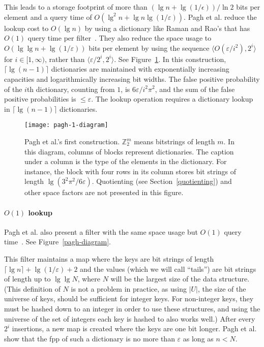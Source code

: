 \documentclass[letterpaper,twocolumn,10pt]{article}
\newcommand{\ints}{\mathbb{Z}}
\newcommand{\etal}{et al.}
\begin{document}
This leads to a storage footprint of more than $(\lg n + \lg (1/\epsilon)) / \ln 2$ bits per element and a query time of $O(\lg^2 n + \lg n \lg (1/\varepsilon))$.
Pagh \etal{} reduce the lookup cost to $O(\lg n)$ by using a dictionary like Raman and Rao's that has $O(1)$ query time per filter~\cite{psw,succinct}.
They also reduce the space usage to $O(\lg \lg n + \lg (1/\varepsilon))$ bits per element by using the sequence $\langle O(\varepsilon / i^2),  2^i \rangle$ for $i \in [1,\infty)$, rather than  $\langle \varepsilon / 2^i,  2^i \rangle$.
See Figure~\ref{pagh-1-diagram}.
In this construction, $\lceil\lg (n-1) \rceil$ dictionaries are maintained with exponentially increasing capacities and logarithmically increasing bit widths.
The false positive probability of the $i$th dictionary, counting from $1$, is $6 \varepsilon / i^2 \pi^2$, and the sum of the false positive probabilities is $\le \varepsilon$.
The lookup operation requires a dictionary lookup in $\lceil\lg(n-1)\rceil$ dictionaries.

\begin{figure}[b!]
\texttt{[image: pagh-1-diagram]}
\caption{\label{pagh-1-diagram}
Pagh \etal{}'s first construction.
$\ints_2^m$ means bitstrings of length $m$.
In this diagram, columns of blocks represent dictionaries.
The caption under a column is the type of the elements in the dictionary. For instance, the block with four rows in its column stores bit strings of length $\lg (3^2 \pi^2 / 6 \varepsilon)$.
Quotienting (see Section~\ref{quotienting}) and other space factors are not presented in this figure.
}
\end{figure}

\paragraph{$O(1)$ lookup}
Pagh \etal{} also present a filter with the same space usage but $O(1)$ query time~\cite{psw}.
See Figure~\ref{pagh-diagram}.

This filter maintains a map where the keys are bit strings of length $\lceil \lg n \rceil + \lg (1/\varepsilon) + 2$ and the values (which we will call ``tails'') are bit strings of length up to $\lg \lg N$, where $N$ will be the largest size of the data structure.
(This definition of $N$ is not a problem in practice, as using $|U|$, the size of the universe of keys, should be sufficient for integer keys. For non-integer keys, they must be hashed down to an integer in order to use these structures, and using the universe of the set of integers each key is hashed to also works well.)
After every $2^i$ insertions, a new map is created where the keys are one bit longer.
Pagh \etal{} show that the fpp of such a dictionary is no more than $\varepsilon$ as long as $n < N$.
\end{document}
